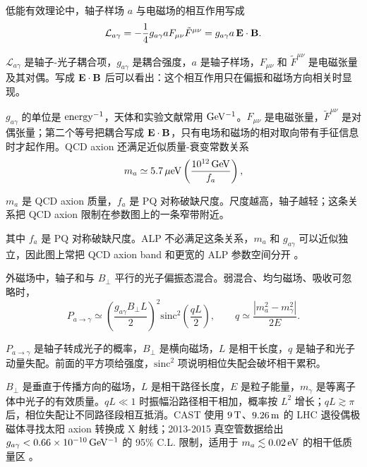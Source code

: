 低能有效理论中，轴子样场 \(a\) 与电磁场的相互作用写成
\begin{equation}
  \mathcal L_{a\gamma}
  =
  -\frac{1}{4}g_{a\gamma}aF_{\mu\nu}\tilde F^{\mu\nu}
  =
  g_{a\gamma}a\,{\bf E}\cdot{\bf B}.
  \label{eq:ch15-axion-lagrangian}
\end{equation}
\begin{formulaexplain}[公式 (15.1) 解读]
\(\mathcal L_{a\gamma}\) 是轴子-光子耦合项，\(g_{a\gamma}\) 是耦合强度，\(a\) 是轴子样场，\(F_{\mu\nu}\) 和 \(\tilde F^{\mu\nu}\) 是电磁张量及其对偶。写成 \({\bf E}\cdot{\bf B}\) 后可以看出：这个相互作用只在偏振和磁场方向相关时显现。
\end{formulaexplain}
\(g_{a\gamma}\) 的单位是 \({\rm energy}^{-1}\)，天体和实验文献常用 \({\rm GeV^{-1}}\)。\(F_{\mu\nu}\) 是电磁张量，\(\tilde F^{\mu\nu}\) 是对偶张量；第二个等号把耦合写成 \({\bf E}\cdot{\bf B}\)，只有电场和磁场的相对取向带有手征信息时才起作用。QCD axion 还满足近似质量-衰变常数关系
\begin{equation}
  m_a \simeq
  5.7\,\mu{\rm eV}
  \left(\frac{10^{12}\,{\rm GeV}}{f_a}\right),
  \label{eq:ch15-qcd-axion-mass}
\end{equation}
\begin{formulaexplain}[公式 (15.2) 解读]
\(m_a\) 是 QCD axion 质量，\(f_a\) 是 PQ 对称破缺尺度。尺度越高，轴子越轻；这条关系把 QCD axion 限制在参数图上的一条窄带附近。
\end{formulaexplain}
其中 \(f_a\) 是 PQ 对称破缺尺度。ALP 不必满足这条关系，\(m_a\) 和 \(g_{a\gamma}\) 可以近似独立，因此图上常把 QCD axion band 和更宽的 ALP 参数空间分开 \citep{2016PhR...643....1M,2014JHEP...06..037D}。

外磁场中，轴子和与 \(B_\perp\) 平行的光子偏振态混合。弱混合、均匀磁场、吸收可忽略时，
\begin{equation}
  P_{a\to\gamma}
  \simeq
  \left(\frac{g_{a\gamma}B_\perp L}{2}\right)^2
  \mathrm{sinc}^2\!\left(\frac{qL}{2}\right),
  \qquad
  q\simeq \frac{|m_a^2-m_\gamma^2|}{2E}.
  \label{eq:ch15-axion-conversion}
\end{equation}
\begin{formulaexplain}[公式 (15.3) 解读]
\(P_{a\to\gamma}\) 是轴子转成光子的概率，\(B_\perp\) 是横向磁场，\(L\) 是相干长度，\(q\) 是轴子和光子动量失配。前面的平方项给强度，\(\mathrm{sinc}^2\) 项说明相位失配会破坏相干累积。
\end{formulaexplain}
\(B_\perp\) 是垂直于传播方向的磁场，\(L\) 是相干路径长度，\(E\) 是粒子能量，\(m_\gamma\) 是等离子体中光子的有效质量。\(qL\ll1\) 时振幅沿路径相干相加，概率按 \(L^2\) 增长；\(qL\gtrsim\pi\) 后，相位失配让不同路径段相互抵消。CAST 使用 \(9\,{\rm T}\)、\(9.26\,{\rm m}\) 的 LHC 退役偶极磁体寻找太阳 axion 转换成 X 射线；2013-2015 真空管数据给出 \(g_{a\gamma}<0.66\times10^{-10}\,{\rm GeV^{-1}}\) 的 95\% C.L. 限制，适用于 \(m_a\lesssim0.02\,{\rm eV}\) 的相干低质量区 \citep{2017NatPh..13..584C}。

